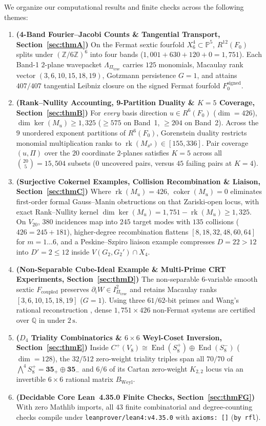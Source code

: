 \documentclass[11pt,a4paper]{amsart}
\theoremstyle{definition}
\theoremstyle{remark}
\DeclareMathOperator{\rk}{rk}
\DeclareMathOperator{\coker}{coker}
\DeclareMathOperator{\End}{End}
\begin{document}
We organize our computational results and finite checks across the following themes:
\begin{enumerate}[label=\textbf{Experiment \Alph*.},leftmargin=2.8em]
\item \textbf{(4-Band Fourier--Jacobi Counts \& Tangential Transport, Section~\ref{sec:thmA})} On the Fermat sextic fourfold $X^4_6 \subset \mathbb{P}^5$, $R^{12}(F_0)$ splits under $(\mathbb{Z}/6\mathbb{Z})^6$ into four bands ($1,001 + 630 + 120 + 0 = 1,751$). Each Band-1 $2$-plane wavepacket $\Lambda_{\Pi_{\mathrm{true}}}$ carries $125$ monomials, Macaulay rank vector $(3,6,10,15,18,19)$, Gotzmann persistence $G=1$, and attains $407/407$ tangential Leibniz closure on the signed Fermat fourfold $F_0^{\mathrm{signed}}$.
\item \textbf{(Rank--Nullity Accounting, 9-Partition Duality \& $K=5$ Coverage, Section~\ref{sec:thmB})} For \emph{every} basis direction $u \in R^6(F_0)$ ($\dim = 426$), $\dim \ker(M_u) \ge 1,325$ ($\ge 575$ on Band~1, $\ge 204$ on Band~2). Across the $9$ unordered exponent partitions of $R^6(F_0)$, Gorenstein duality restricts monomial multiplication ranks to $\rk(M_{x^b}) \in [155, 336]$. Pair coverage $(u, \Pi)$ over the $20$ coordinate $2$-planes satisfies $K=5$ across all $\binom{20}{5} = 15,504$ subsets ($0$ uncovered pairs, versus $45$ failing pairs at $K=4$).
\item \textbf{(Surjective Cokernel Examples, Collision Recombination \& Liaison, Section~\ref{sec:thmC})} Where $\rk(M_u) = 426$, $\coker(M_u) = 0$ eliminates first-order formal Gauss--Manin obstructions on that Zariski-open locus, with exact Rank--Nullity kernel $\dim \ker(M_u) = 1,751 - \rk(M_u) \ge 1,325$. On $V_{20}$, $380$ incidences map into $245$ target modes with $135$ collisions ($426 = 245 + 181$), higher-degree recombination flattens $[8,18,32,48,60,64]$ for $m=1\dots 6$, and a Peskine--Szpiro liaison example compresses $D = 22 > 12$ into $D' = 2 \le 12$ inside $V(G_2, G_2') \cap X_4$.
\item \textbf{(Non-Separable Cube-Ideal Example \& Multi-Prime CRT Experiments, Section~\ref{sec:thmD})} The non-separable $6$-variable smooth sextic $F_{\mathrm{coupled}}$ preserves $\partial_i W \in I_{\Pi_{\mathrm{true}}}^2$ and retains Macaulay ranks $[3,6,10,15,18,19]$ ($G=1$). Using three $61/62$-bit primes and Wang's rational reconstruction \cite{Wang1981}, dense $1,751 \times 426$ non-Fermat systems are certified over $\mathbb{Q}$ in under $2\,\mathrm{s}$.
\item \textbf{($D_4$ Triality Combinatorics \& $6 \times 6$ Weyl-Coset Inversion, Section~\ref{sec:thmE})} Inside $C^+(V_8) \cong \End(S^+_8) \oplus \End(S^-_8)$ ($\dim = 128$), the $32/512$ zero-weight triality triples span all $70/70$ of $\bigwedge^4 S^+_8 = \mathbf{35}_+ \oplus \mathbf{35}_-$ and $6/6$ of its Cartan zero-weight $K_{2,2}$ locus via an invertible $6 \times 6$ rational matrix $B_{\mathrm{Weyl}}$.
\item \textbf{(Decidable Core Lean~4.35.0 Finite Checks, Section~\ref{sec:thmFG})} With zero Mathlib imports, all $43$ finite combinatorial and degree-counting checks compile under \texttt{leanprover/lean4:v4.35.0} with \texttt{axioms: []} (\texttt{by rfl}).
\end{enumerate}
\end{document}
